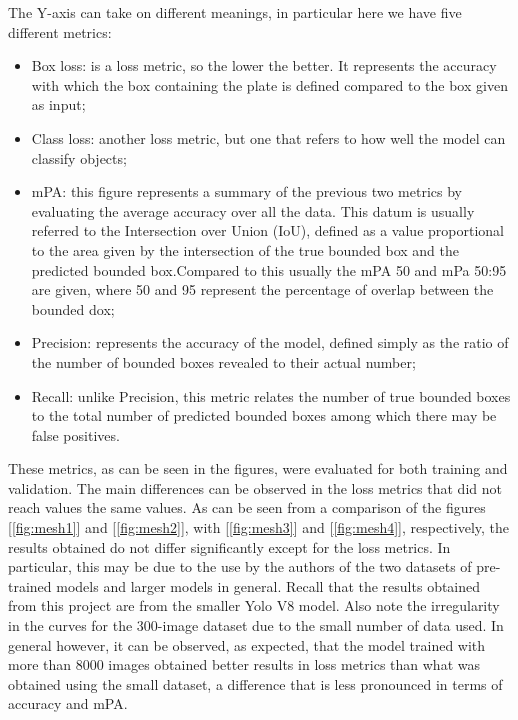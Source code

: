 \documentclass[12pt]{article}
\begin{document}
The Y-axis can take on different meanings, in particular here we have five different metrics:
\begin{itemize}
    \item Box loss: is a loss metric, so the lower the better. It represents the accuracy with which the box containing the plate is defined compared to the box given as input;
    \item Class loss: another loss metric, but one that refers to how well the model can classify objects;
    \item mPA: this figure represents a summary of the previous two metrics by evaluating the average accuracy over all the data. This datum is usually referred to the Intersection over Union (IoU), defined as a value proportional to the area given by the intersection of the true bounded box and the predicted bounded box.Compared to this usually the mPA 50 and mPa 50:95 are given, where 50 and 95 represent the percentage of overlap between the bounded dox;
    \item Precision: represents the accuracy of the model, defined simply as the ratio of the number of bounded boxes revealed to their actual number;
    \item Recall: unlike Precision, this metric relates the number of true bounded boxes to the total number of predicted bounded boxes among which there may be false positives.
\end{itemize}

These metrics, as can be seen in the figures, were evaluated for both training and validation. The main differences can be observed in the loss metrics that did not reach values the same values. As can be seen from a comparison of the figures [\ref{fig:mesh1}] and [\ref{fig:mesh2}], with [\ref{fig:mesh3}] and [\ref{fig:mesh4}], respectively, the results obtained do not differ significantly except for the loss metrics. In particular, this may be due to the use by the authors of the two datasets of pre-trained models and larger models in general. Recall that the results obtained from this project are from the smaller Yolo V8 model. Also note the irregularity in the curves for the 300-image dataset due to the small number of data used.
In general however, it can be observed, as expected, that the model trained with more than 8000 images obtained better results in loss metrics than what was obtained using the small dataset, a difference that is less pronounced in terms of accuracy and mPA.

\end{document}
